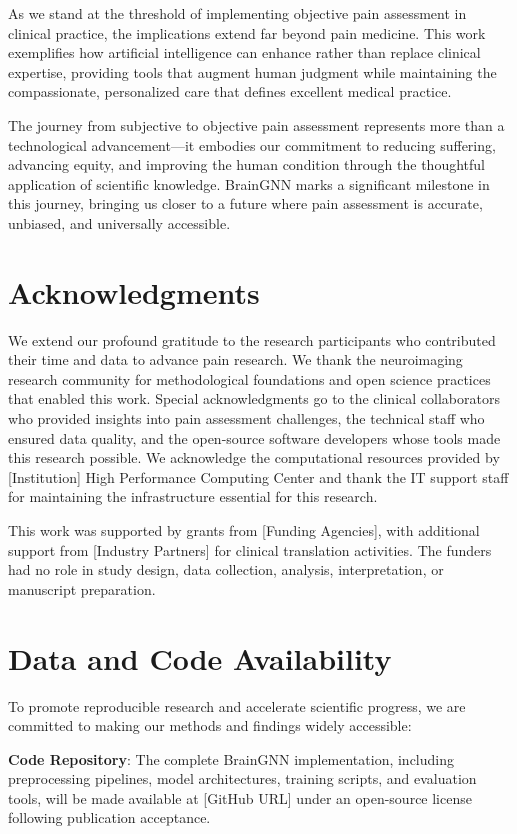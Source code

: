 As we stand at the threshold of implementing objective pain assessment in clinical practice, the implications extend far beyond pain medicine. This work exemplifies how artificial intelligence can enhance rather than replace clinical expertise, providing tools that augment human judgment while maintaining the compassionate, personalized care that defines excellent medical practice.

The journey from subjective to objective pain assessment represents more than a technological advancement---it embodies our commitment to reducing suffering, advancing equity, and improving the human condition through the thoughtful application of scientific knowledge. BrainGNN marks a significant milestone in this journey, bringing us closer to a future where pain assessment is accurate, unbiased, and universally accessible.

\section*{Acknowledgments}

We extend our profound gratitude to the research participants who contributed their time and data to advance pain research. We thank the neuroimaging research community for methodological foundations and open science practices that enabled this work. Special acknowledgments go to the clinical collaborators who provided insights into pain assessment challenges, the technical staff who ensured data quality, and the open-source software developers whose tools made this research possible. We acknowledge the computational resources provided by [Institution] High Performance Computing Center and thank the IT support staff for maintaining the infrastructure essential for this research.

This work was supported by grants from [Funding Agencies], with additional support from [Industry Partners] for clinical translation activities. The funders had no role in study design, data collection, analysis, interpretation, or manuscript preparation.

\section*{Data and Code Availability}

To promote reproducible research and accelerate scientific progress, we are committed to making our methods and findings widely accessible:

\textbf{Code Repository}: The complete BrainGNN implementation, including preprocessing pipelines, model architectures, training scripts, and evaluation tools, will be made available at [GitHub URL] under an open-source license following publication acceptance.

